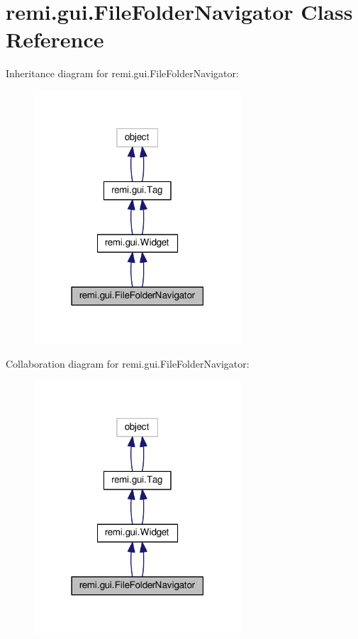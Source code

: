\hypertarget{classremi_1_1gui_1_1FileFolderNavigator}{}\section{remi.\+gui.\+File\+Folder\+Navigator Class Reference}
\label{classremi_1_1gui_1_1FileFolderNavigator}


Inheritance diagram for remi.\+gui.\+File\+Folder\+Navigator\+:
\nopagebreak
\begin{figure}[H]
\begin{center}
\leavevmode
\includegraphics[width=219pt]{d6/d18/classremi_1_1gui_1_1FileFolderNavigator__inherit__graph}
\end{center}
\end{figure}


Collaboration diagram for remi.\+gui.\+File\+Folder\+Navigator\+:
\nopagebreak
\begin{figure}[H]
\begin{center}
\leavevmode
\includegraphics[width=219pt]{d5/dd7/classremi_1_1gui_1_1FileFolderNavigator__coll__graph}
\end{center}
\end{figure}
